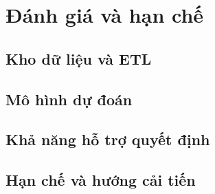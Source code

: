 \section{Đánh giá và hạn chế}
\subsection{Kho dữ liệu và ETL}
\subsection{Mô hình dự đoán}
\subsection{Khả năng hỗ trợ quyết định}
\subsection{Hạn chế và hướng cải tiến}
